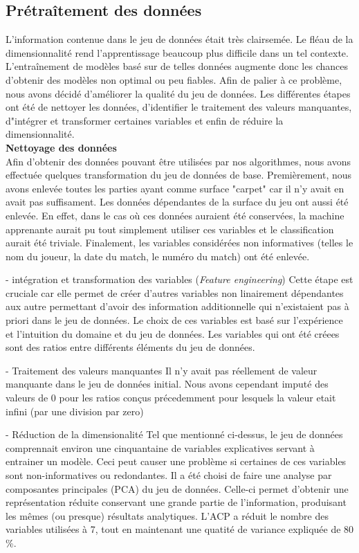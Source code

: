 \subsection{Prétraîtement des données}

L'information contenue dans le jeu de données était très clairsemée. Le fléau de la dimensionnalité rend l'apprentissage beaucoup plus difficile dans un tel contexte. L'entraînement de modèles basé sur de telles données augmente donc les chances d'obtenir des modèles non optimal ou peu fiables. Afin de palier à ce problème, nous avons décidé d'améliorer la qualité du jeu de données. Les différentes étapes ont été de nettoyer les données, d'identifier le traitement des valeurs manquantes, d"intégrer et transformer certaines variables et enfin de réduire la dimensionnalité.\\

\textbf{Nettoyage des données}\\
Afin d'obtenir des données pouvant être utilisées par nos algorithmes, nous avons effectuée quelques transformation du jeu de données de base. Premièrement, nous avons enlevée toutes les parties ayant comme surface "carpet" car il n'y avait en avait pas suffisament. Les données dépendantes de la surface du jeu ont aussi été enlevée. En effet, dans le cas où ces données auraient été conservées, la machine apprenante aurait pu tout simplement utiliser ces variables et le classification aurait été triviale. Finalement, les variables considérées non informatives (telles le nom du joueur, la date du match, le numéro du match) ont été enlevée.

- intégration et transformation des variables (\textit{Feature engineering}) 
Cette étape est cruciale car elle permet de créer d'autres variables non linairement dépendantes aux autre permettant d'avoir des information additionnelle qui n'existaient pas à priori dans le jeu de données. Le choix de ces variables est basé sur l'expérience et l'intuition du domaine et du jeu de données.
Les variables qui ont été créees sont des ratios entre différents éléments du jeu de données.

- Traitement des valeurs manquantes
Il n'y avait pas réellement de valeur manquante dans le jeu de données initial. Nous avons cependant imputé des valeurs de 0 pour les ratios conçus précedemment pour lesquels la valeur etait infini (par une division par zero)

- Réduction de la dimensionalité
Tel que mentionné ci-dessus, le jeu de données comprennait environ une cinquantaine de variables explicatives servant à entrainer un modèle. Ceci peut causer une problème si certaines de ces variables sont non-informatives ou redondantes. Il a été choisi de faire une analyse par composantes principales (PCA) du jeu de données. Celle-ci permet d'obtenir une représentation réduite conservant une grande partie de l'information, produisant les mêmes (ou presque) résultats analytiques. L'ACP a réduit le nombre des variables utilisées à 7, tout en maintenant une quatité de variance expliquée de 80 \%. 

